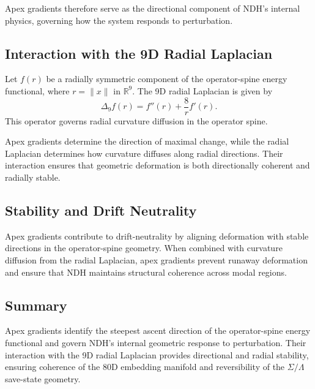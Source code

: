 Apex gradients therefore serve as the directional component of NDH's internal
physics, governing how the system responds to perturbation.

\subsection{Interaction with the 9D Radial Laplacian}

Let $f(r)$ be a radially symmetric component of the operator-spine energy
functional, where $r = \|x\|$ in $\mathbb{R}^9$. The 9D radial Laplacian is
given by
\[
\Delta_9 f(r)
    = f''(r) + \frac{8}{r} f'(r).
\]
This operator governs radial curvature diffusion in the operator spine.

Apex gradients determine the direction of maximal change, while the radial
Laplacian determines how curvature diffuses along radial directions. Their
interaction ensures that geometric deformation is both directionally coherent
and radially stable.

\subsection{Stability and Drift Neutrality}

Apex gradients contribute to drift-neutrality by aligning deformation with
stable directions in the operator-spine geometry. When combined with curvature
diffusion from the radial Laplacian, apex gradients prevent runaway deformation
and ensure that NDH maintains structural coherence across modal regions.

\subsection{Summary}

Apex gradients identify the steepest ascent direction of the operator-spine
energy functional and govern NDH's internal geometric response to perturbation.
Their interaction with the 9D radial Laplacian provides directional and radial
stability, ensuring coherence of the 80D embedding manifold and reversibility of
the $\Sigma/\Lambda$ save-state geometry.
